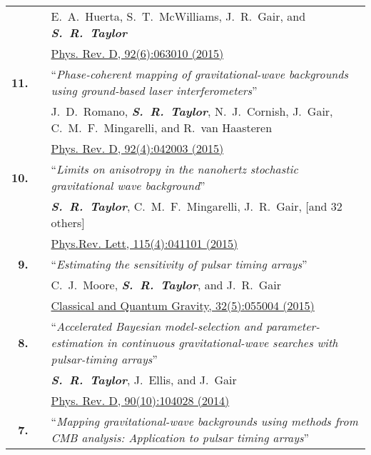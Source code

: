 \documentclass[11pt,letterpaper,sans]{moderncv}
\begin{document}
{\begin{longtable}{rp{0.3cm}p{15.8cm}}
&& E.~A.~Huerta, S.~T.~McWilliams, J.~R.~Gair, and \textit{\textbf{S.~R.~Taylor}} \\ 
&& \href{http://journals.aps.org/prd/abstract/10.1103/PhysRevD.92.063010}{{\color{color1} Phys. Rev. D, 92(6):063010 (2015)}} \vspace{0.09cm}\\
\textbf{11.} & & ``\textit{Phase-coherent mapping of gravitational-wave backgrounds using ground-based laser interferometers}'' \\ 
&& J.~D.~Romano, \textit{\textbf{S.~R.~Taylor}}, N.~J.~Cornish, J.~Gair, C.~M.~F.~Mingarelli, and R.~van Haasteren \\ 
&& \href{http://journals.aps.org/prd/abstract/10.1103/PhysRevD.92.042003}{{\color{color1} Phys. Rev. D, 92(4):042003 (2015)}} \vspace{0.09cm}\\
\textbf{10.} & & ``\textit{Limits on anisotropy in the nanohertz stochastic gravitational wave background}'' \\ 
&& \textit{\textbf{S.~R.~Taylor}}, C.~M.~F.~Mingarelli, J.~R.~Gair, [and 32 others] \\ 
&& \href{http://journals.aps.org/prl/abstract/10.1103/PhysRevLett.115.041101}{{\color{color1} Phys.Rev. Lett, 115(4):041101 (2015)}} \vspace{0.09cm}\\
\textbf{9.} & & ``\textit{Estimating the sensitivity of pulsar timing arrays}'' \\ 
&& C.~J.~Moore, \textit{\textbf{S.~R.~Taylor}}, and J.~R.~Gair \\ 
&& \href{http://iopscience.iop.org/article/10.1088/0264-9381/32/5/055004/meta}{{\color{color1} Classical and Quantum Gravity, 32(5):055004 (2015)}} \vspace{0.09cm}\\
\textbf{8.} & & ``\textit{Accelerated Bayesian model-selection and parameter-estimation in continuous gravitational-wave searches with pulsar-timing arrays}'' \\ 
&& \textit{\textbf{S.~R.~Taylor}}, J.~Ellis, and J.~Gair \\ 
&& \href{http://journals.aps.org/prd/abstract/10.1103/PhysRevD.90.104028}{{\color{color1} Phys. Rev. D, 90(10):104028 (2014)}} \vspace{0.09cm}\\
\textbf{7.} & & ``\textit{Mapping gravitational-wave backgrounds using methods from CMB analysis: Application to pulsar timing arrays}'' \\ 

\end{longtable}}
\end{document}
